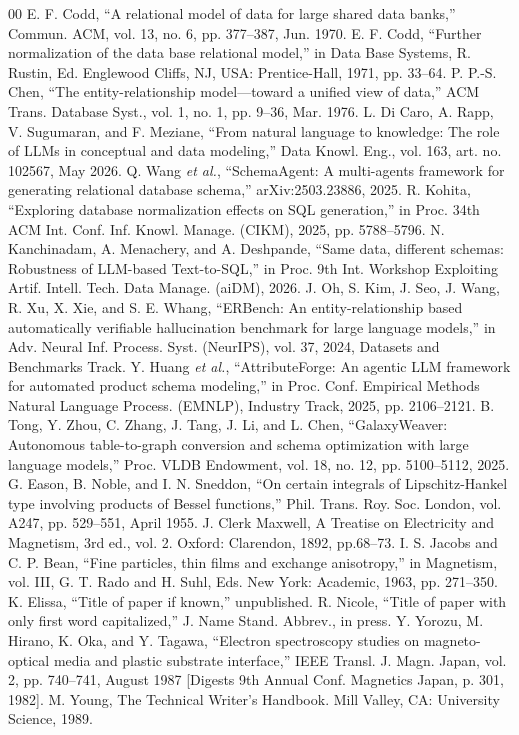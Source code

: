 \documentclass[conference]{IEEEtran}
\begin{document}
\begin{thebibliography}{00}
 E. F. Codd, ``A relational model of data for large shared data banks,'' Commun. ACM, vol. 13, no. 6, pp. 377--387, Jun. 1970.
 E. F. Codd, ``Further normalization of the data base relational model,'' in Data Base Systems, R. Rustin, Ed. Englewood Cliffs, NJ, USA: Prentice-Hall, 1971, pp. 33--64.
 P. P.-S. Chen, ``The entity-relationship model---toward a unified view of data,'' ACM Trans. Database Syst., vol. 1, no. 1, pp. 9--36, Mar. 1976.
 L. Di Caro, A. Rapp, V. Sugumaran, and F. Meziane, ``From natural language to knowledge: The role of LLMs in conceptual and data modeling,'' Data Knowl. Eng., vol. 163, art. no. 102567, May 2026.
 Q. Wang \textit{et al.}, ``SchemaAgent: A multi-agents framework for generating relational database schema,'' arXiv:2503.23886, 2025.
 R. Kohita, ``Exploring database normalization effects on SQL generation,'' in Proc. 34th ACM Int. Conf. Inf. Knowl. Manage. (CIKM), 2025, pp. 5788--5796.
 N. Kanchinadam, A. Menachery, and A. Deshpande, ``Same data, different schemas: Robustness of LLM-based Text-to-SQL,'' in Proc. 9th Int. Workshop Exploiting Artif. Intell. Tech. Data Manage. (aiDM), 2026.
 J. Oh, S. Kim, J. Seo, J. Wang, R. Xu, X. Xie, and S. E. Whang, ``ERBench: An entity-relationship based automatically verifiable hallucination benchmark for large language models,'' in Adv. Neural Inf. Process. Syst. (NeurIPS), vol. 37, 2024, Datasets and Benchmarks Track.
 Y. Huang \textit{et al.}, ``AttributeForge: An agentic LLM framework for automated product schema modeling,'' in Proc. Conf. Empirical Methods Natural Language Process. (EMNLP), Industry Track, 2025, pp. 2106--2121.
 B. Tong, Y. Zhou, C. Zhang, J. Tang, J. Li, and L. Chen, ``GalaxyWeaver: Autonomous table-to-graph conversion and schema optimization with large language models,'' Proc. VLDB Endowment, vol. 18, no. 12, pp. 5100--5112, 2025.
 G. Eason, B. Noble, and I. N. Sneddon, ``On certain integrals of Lipschitz-Hankel type involving products of Bessel functions,'' Phil. Trans. Roy. Soc. London, vol. A247, pp. 529--551, April 1955.
 J. Clerk Maxwell, A Treatise on Electricity and Magnetism, 3rd ed., vol. 2. Oxford: Clarendon, 1892, pp.68--73.
 I. S. Jacobs and C. P. Bean, ``Fine particles, thin films and exchange anisotropy,'' in Magnetism, vol. III, G. T. Rado and H. Suhl, Eds. New York: Academic, 1963, pp. 271--350.
 K. Elissa, ``Title of paper if known,'' unpublished.
 R. Nicole, ``Title of paper with only first word capitalized,'' J. Name Stand. Abbrev., in press.
 Y. Yorozu, M. Hirano, K. Oka, and Y. Tagawa, ``Electron spectroscopy studies on magneto-optical media and plastic substrate interface,'' IEEE Transl. J. Magn. Japan, vol. 2, pp. 740--741, August 1987 [Digests 9th Annual Conf. Magnetics Japan, p. 301, 1982].
 M. Young, The Technical Writer's Handbook. Mill Valley, CA: University Science, 1989.
\end{thebibliography}
\end{document}
